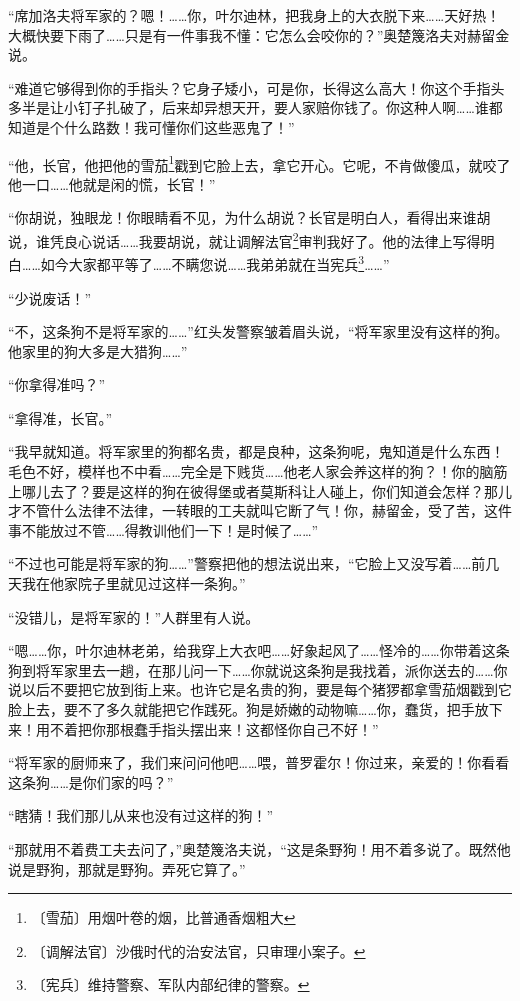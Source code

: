 \documentclass[12pt,UTF-8,openany]{ctexbook}
\begin{document}
\begin{normalsize}
    “席加洛夫将军家的？嗯！……你，叶尔迪林，把我身上的大衣脱下来……天好热！大概快要下雨了……只是有一件事我不懂：它怎么会咬你的？”奥楚篾洛夫对赫留金说。
    
    “难道它够得到你的手指头？它身子矮小，可是你，长得这么高大！你这个手指头多半是让小钉子扎破了，后来却异想天开，要人家赔你钱了。你这种人啊……谁都知道是个什么路数！我可懂你们这些恶鬼了！”
    
    “他，长官，他把他的雪茄\footnote{〔雪茄〕用烟叶卷的烟，比普通香烟粗大}戳到它脸上去，拿它开心。它呢，不肯做傻瓜，就咬了他一口……他就是闲的慌，长官！”
    
    “你胡说，独眼龙！你眼睛看不见，为什么胡说？长官是明白人，看得出来谁胡说，谁凭良心说话……我要胡说，就让调解法官\footnote{〔调解法官〕沙俄时代的治安法官，只审理小案子。}审判我好了。他的法律上写得明白……如今大家都平等了……不瞒您说……我弟弟就在当宪兵\footnote{〔宪兵〕维持警察、军队内部纪律的警察。}……”
    
    “少说废话！”
    
    “不，这条狗不是将军家的……”红头发警察皱着眉头说，“将军家里没有这样的狗。他家里的狗大多是大猎狗……”
    
    “你拿得准吗？”
    
    “拿得准，长官。”
    
    “我早就知道。将军家里的狗都名贵，都是良种，这条狗呢，鬼知道是什么东西！毛色不好，模样也不中看……完全是下贱货……他老人家会养这样的狗？！你的脑筋上哪儿去了？要是这样的狗在彼得堡或者莫斯科让人碰上，你们知道会怎样？那儿才不管什么法律不法律，一转眼的工夫就叫它断了气！你，赫留金，受了苦，这件事不能放过不管……得教训他们一下！是时候了……”
    
    “不过也可能是将军家的狗……”警察把他的想法说出来，“它脸上又没写着……前几天我在他家院子里就见过这样一条狗。”
    
    “没错儿，是将军家的！”人群里有人说。
    
    “嗯……你，叶尔迪林老弟，给我穿上大衣吧……好象起风了……怪冷的……你带着这条狗到将军家里去一趟，在那儿问一下……你就说这条狗是我找着，派你送去的……你说以后不要把它放到街上来。也许它是名贵的狗，要是每个猪猡都拿雪茄烟戳到它脸上去，要不了多久就能把它作践死。狗是娇嫩的动物嘛……你，蠢货，把手放下来！用不着把你那根蠢手指头摆出来！这都怪你自己不好！”
    
    “将军家的厨师来了，我们来问问他吧……喂，普罗霍尔！你过来，亲爱的！你看看这条狗……是你们家的吗？”
    
    “瞎猜！我们那儿从来也没有过这样的狗！”
    
    “那就用不着费工夫去问了，”奥楚篾洛夫说，“这是条野狗！用不着多说了。既然他说是野狗，那就是野狗。弄死它算了。”
    

\end{normalsize}
\end{document}
